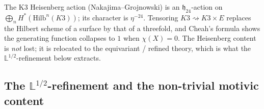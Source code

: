 \begin{remark}
\label{rem:k3qt-diagnosis-k3e-kills-heisenberg}
The K3 Heisenberg action (Nakajima--Grojnowski) is an
$\mathfrak h_{24}$-action on $\bigoplus_n H^*(\mathrm{Hilb}^n(K3))$;
its character is $\eta^{-24}$. Tensoring $K3 \rightsquigarrow K3 \times E$
replaces the Hilbert scheme of a surface by that of a threefold, and
Cheah's formula shows the generating function collapses to $1$
when $\chi(X) = 0$. The Heisenberg content is \emph{not} lost; it
is relocated to the equivariant / refined theory, which is what the
$\mathbb L^{1/2}$-refinement below extracts.
\end{remark}

\subsection*{The \texorpdfstring{$\mathbb L^{1/2}$}{L-1/2}-refinement and the non-trivial motivic content}

